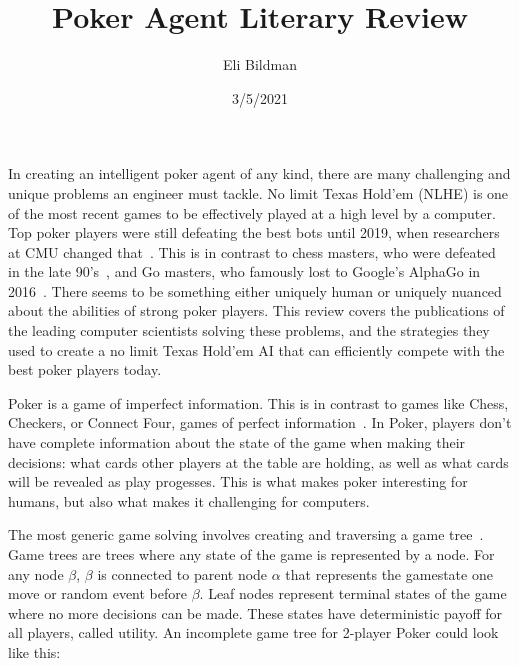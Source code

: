 \documentclass[12pt, letterpaper]{article}
\title{Poker Agent Literary Review}
\author{Eli Bildman}
\date{3/5/2021}
\begin{document}
\maketitle

In creating an intelligent poker agent of any kind, there are many challenging and unique
problems an engineer must tackle. No limit Texas Hold’em (NLHE) is one of the most recent games to be
effectively played at a high level by a computer. Top poker players were still defeating the best
bots until 2019, when researchers at CMU changed that~\cite{texasholdemaiwin}. This is in contrast to chess masters, who
were defeated in the late 90’s~\cite{chessai}, and Go masters, who famously lost to Google's AlphaGo in
2016~\cite{alphago}. There seems to be something either uniquely human or uniquely nuanced about the
abilities of strong poker players. This review covers the publications of the leading
computer scientists solving these problems, and the strategies they used to create a no limit
Texas Hold’em AI that can efficiently compete with the best poker players today.

Poker is a game of imperfect information. This is in contrast to
games like Chess, Checkers, or Connect Four, games of perfect information~\cite{time-and-space}. In
Poker, players don't have complete information about the state of the game when making their
decisions: what cards other players at the table are holding, as well as what cards will 
be revealed as play progesses. This is what makes poker interesting for humans, but also what makes it challenging for
computers.

The most generic game solving involves creating and traversing a game
tree~\cite{time-and-space}. Game trees are trees where any state of the game is represented by a node. For any node $\beta$,
$\beta$ is connected to parent node $\alpha$ that represents the gamestate one move or random event before $\beta$.
Leaf nodes represent terminal states of the game where no more decisions can be made. These
states have deterministic payoff for all players, called utility. An incomplete game tree for
2-player Poker could look like this:
\end{document}
